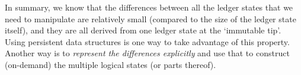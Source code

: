 \documentclass[11pt,a4paper]{article}
\begin{document}
\begin{center}
\end{center}
In summary, we know that the differences between all the ledger states that we
need to manipulate are relatively small (compared to the size of the ledger
state itself), and they are all derived from one ledger state at the `immutable
tip'. Using persistent data structures is one way to take advantage of this
property. Another way is to \emph{represent the differences explicitly} and
use that to construct (on-demand) the multiple logical states (or parts
thereof).
\end{document}
